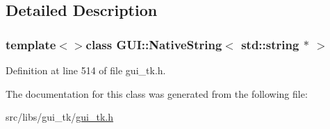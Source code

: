 \subsection{Detailed Description}
\subsubsection*{template$<$$>$class G\-U\-I\-::\-Native\-String$<$ std\-::string $\ast$ $>$}



Definition at line 514 of file gui\-\_\-tk.\-h.



The documentation for this class was generated from the following file\-:\begin{DoxyCompactItemize}
\item 
src/libs/gui\-\_\-tk/\hyperlink{gui__tk_8h}{gui\-\_\-tk.\-h}\end{DoxyCompactItemize}

